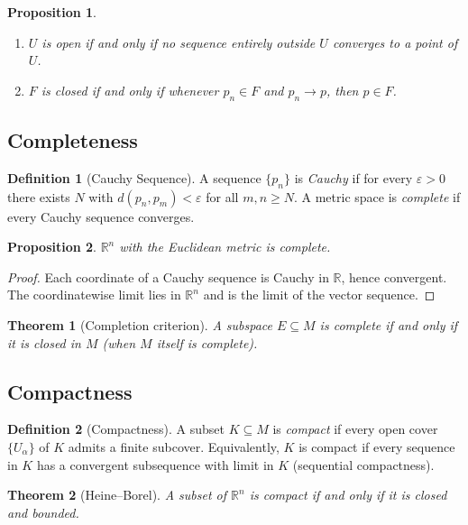 \documentclass{article}
\theoremstyle{definition}
\newtheorem{definition}{Definition}[section]
\theoremstyle{plain}
\newtheorem{theorem}{Theorem}[section]
\newtheorem{proposition}{Proposition}[section]
\begin{document}
\begin{proposition}\label{prop:log-exp}
	\begin{enumerate}
		\item $U$ is open if and only if no sequence entirely outside $U$ converges to a point of $U$.
		\item $F$ is closed if and only if whenever $p_n\in F$ and $p_n\to p$, then $p\in F$.
	\end{enumerate}
\end{proposition}

	\subsection{Completeness}\label{subsec:metric-completeness}
\begin{definition}[Cauchy Sequence]
A sequence $\{p_n\}$ is \emph{Cauchy} if for every $\varepsilon>0$ there exists $N$ with $d(p_n,p_m)<\varepsilon$ for all $m,n\ge N$. A metric space is \emph{complete} if every Cauchy sequence converges.
\end{definition}

\begin{proposition}
$\mathbb{R}^n$ with the Euclidean metric is complete.
\end{proposition}
\begin{proof}
Each coordinate of a Cauchy sequence is Cauchy in $\mathbb{R}$, hence convergent. The coordinatewise limit lies in $\mathbb{R}^n$ and is the limit of the vector sequence.
\end{proof}

\begin{theorem}[Completion criterion]
A subspace $E\subseteq M$ is complete if and only if it is closed in $M$ (when $M$ itself is complete).
\end{theorem}

	\subsection{Compactness}\label{subsec:compactness}
\begin{definition}[Compactness]
A subset $K\subseteq M$ is \emph{compact} if every open cover $\{U_\alpha\}$ of $K$ admits a finite subcover. Equivalently, $K$ is compact if every sequence in $K$ has a convergent subsequence with limit in $K$ (sequential compactness).
\end{definition}

\begin{theorem}[Heine--Borel]
A subset of $\mathbb{R}^n$ is compact if and only if it is closed and bounded.
\end{theorem}
\end{document}
